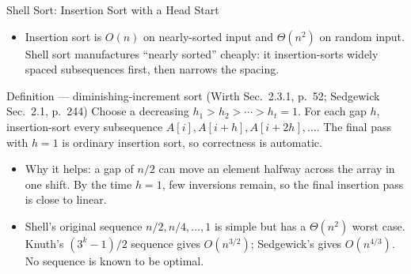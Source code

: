 \documentclass[aspectratio=169]{beamer}
\begin{document}
\begin{frame}{Shell Sort: Insertion Sort with a Head Start}
  \begin{itemize}
    \item Insertion sort is $O(n)$ on nearly-sorted input and $\Theta(n^2)$
      on random input. Shell sort manufactures ``nearly sorted'' cheaply: it
      insertion-sorts widely spaced subsequences first, then narrows the
      spacing.
  \end{itemize}
  \begin{block}{Definition --- diminishing-increment sort
    (Wirth Sec.~2.3.1, p.~52; Sedgewick Sec.~2.1, p.~244)}
    Choose a decreasing  $h_1 > h_2 > \cdots > h_t = 1$.
    For each gap $h$, insertion-sort every subsequence
    $A[i], A[i+h], A[i+2h], \dots$. The final pass with $h=1$ is ordinary
    insertion sort, so correctness is automatic.
  \end{block}
  \begin{itemize}
    \item Why it helps: a gap of $n/2$ can move an element halfway across the
      array in one shift. By the time $h=1$, few inversions remain, so the
      final insertion pass is close to linear.
    \item Shell's original sequence $n/2, n/4, \dots, 1$ is simple but has a
      $\Theta(n^2)$ worst case. Knuth's $(3^k-1)/2$ sequence gives
      $O(n^{3/2})$; Sedgewick's gives $O(n^{4/3})$. No sequence is known to
      be optimal.
  \end{itemize}
\end{frame}
\end{document}
